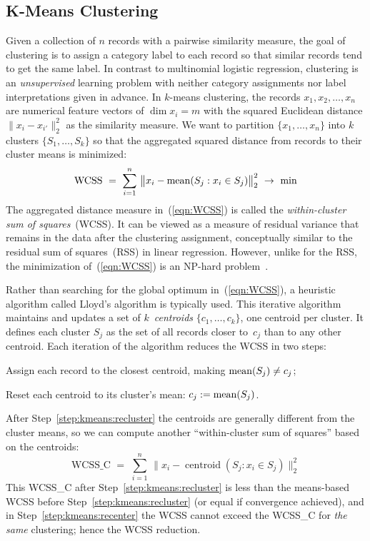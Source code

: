\subsection{K-Means Clustering}

\smallskip

Given a collection of $n$ records with a pairwise similarity measure,
the goal of clustering is to assign a category label to each record so that
similar records tend to get the same label.  In contrast to multinomial
logistic regression, clustering is an \emph{unsupervised}\/ learning problem
with neither category assignments nor label interpretations given in advance.
In $k$-means clustering, the records $x_1, x_2, \ldots, x_n$ are numerical
feature vectors of $\dim x_i = m$ with the squared Euclidean distance 
$\|x_i - x_{i'}\|_2^2$ as the similarity measure.  We want to partition
$\{x_1, \ldots, x_n\}$ into $k$ clusters $\{S_1, \ldots, S_k\}$ so that
the aggregated squared distance from records to their cluster means is
minimized:
\begin{equation}
\textrm{WCSS}\,\,=\,\, \sum_{i=1}^n \,\big\|x_i - \mathop{\mathrm{mean}}\nolimits(S_j: x_i\in S_j)\big\|_2^2 \,\,\to\,\,\min
\label{eqn:WCSS}
\end{equation}
The aggregated distance measure in~(\ref{eqn:WCSS}) is called the
\emph{within-cluster sum of squares}~(WCSS).  It can be viewed as a measure
of residual variance that remains in the data after the clustering assignment,
conceptually similar to the residual sum of squares~(RSS) in linear regression.
However, unlike for the RSS, the minimization of~(\ref{eqn:WCSS}) is an NP-hard 
problem~\cite{AloiseDHP2009:kmeans}.

Rather than searching for the global optimum in~(\ref{eqn:WCSS}), a heuristic algorithm
called Lloyd's algorithm is typically used.  This iterative algorithm maintains
and updates a set of $k$~\emph{centroids} $\{c_1, \ldots, c_k\}$, one centroid per cluster.
It defines each cluster $S_j$ as the set of all records closer to~$c_j$ than
to any other centroid.  Each iteration of the algorithm reduces the WCSS in two steps:
\begin{Enumerate}
\item Assign each record to the closest centroid, making $\mathop{\mathrm{mean}}\nolimits(S_j)\neq c_j$;
\label{step:kmeans:recluster}
\item Reset each centroid to its cluster's mean: $c_j := \mathop{\mathrm{mean}}\nolimits(S_j)$.
\label{step:kmeans:recenter}
\end{Enumerate}
After Step~\ref{step:kmeans:recluster} the centroids are generally different from the cluster
means, so we can compute another ``within-cluster sum of squares'' based on the centroids:
\begin{equation}
\textrm{WCSS\_C}\,\,=\,\, \sum_{i=1}^n \,\big\|x_i - \mathop{\textrm{centroid}}(S_j: x_i\in S_j)\big\|_2^2
\label{eqn:WCSS:C}
\end{equation}
This WCSS\_C after Step~\ref{step:kmeans:recluster} is less than the means-based WCSS
before Step~\ref{step:kmeans:recluster} (or equal if convergence achieved), and in
Step~\ref{step:kmeans:recenter} the WCSS cannot exceed the WCSS\_C for \emph{the same}
clustering; hence the WCSS reduction.

